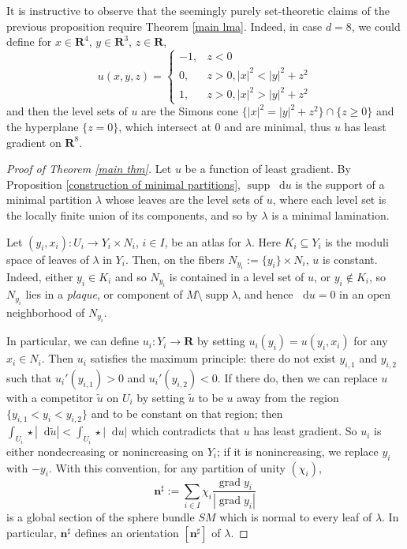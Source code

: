 \documentclass[reqno,11pt]{amsart}
\newcommand{\RR}{\mathbf{R}}
\DeclareMathOperator{\supp}{supp}
\newcommand*\dif{\mathop{}\!\mathrm{d}}
\DeclareMathOperator{\grad}{grad}
\newcommand{\normal}{\mathbf n}
\newcommand{\dfn}[1]{\emph{#1}\index{#1}}
\theoremstyle{definition}
\numberwithin{equation}{section}
\begin{document}
It is instructive to observe that the seemingly purely set-theoretic claims of the previous proposition require Theorem \ref{main lma}.
Indeed, in case $d = 8$, we could define for $x \in \RR^4$, $y \in \RR^3$, $z \in \RR$,
$$u(x, y, z) = \begin{cases}
-1, & z < 0 \\
0, & z > 0, |x|^2 < |y|^2 + z^2 \\
1, & z > 0, |x|^2 > |y|^2 + z^2
\end{cases}$$
and then the level sets of $u$ are the Simons cone $\{|x|^2 = |y|^2 + z^2\} \cap \{z \geq 0\}$ and the hyperplane $\{z = 0\}$, which intersect at $0$ and are minimal, thus $u$ has least gradient on $\RR^8$.

\begin{proof}[Proof of Theorem \ref{main thm}]
Let $u$ be a function of least gradient.
By Proposition \ref{construction of minimal partitions}, $\supp \dif u$ is the support of a minimal partition $\lambda$ whose leaves are the level sets of $u$, where each level set is the locally finite union of its components, and so by \cite[TODO]{BackusCML} $\lambda$ is a minimal lamination.

Let $(y_i, x_i): U_i \to Y_i \times N_i$, $i \in I$, be an atlas for $\lambda$.
Here $K_i \subseteq Y_i$ is the moduli space of leaves of $\lambda$ in $Y_i$.
Then, on the fibers $N_{y_i} := \{y_i\} \times N_i$, $u$ is constant.
Indeed, either $y_i \in K_i$ and so $N_{y_i}$ is contained in a level set of $u$, or $y_i \notin K_i$, so $N_{y_i}$ lies in a \dfn{plaque}, or component of $M \setminus \supp \lambda$, and hence $\dif u = 0$ in an open neighborhood of $N_{y_i}$.

In particular, we can define $u_i: Y_i \to \RR$ by setting $u_i(y_i) = u(y_i, x_i)$ for any $x_i \in N_i$.
Then $u_i$ satisfies the maximum principle: there do not exist $y_{i,1}$ and $y_{i,2}$ such that $u_i'(y_{i,1}) > 0$ and $u_i'(y_{i,2}) < 0$.
If there do, then we can replace $u$ with a competitor $\tilde u$ on $U_i$ by setting $\tilde u$ to be $u$ away from the region $\{y_{i,1} < y_i < y_{i,2}\}$ and to be constant on that region; then $\int_{U_i} \star |\dif \tilde u| < \int_{U_i} \star |\dif u|$ which contradicts that $u$ has least gradient.
So $u_i$ is either nondecreasing or nonincreasing on $Y_i$; if it is nonincreasing, we replace $y_i$ with $-y_i$.
With this convention, for any partition of unity $(\chi_i)$,
$$\normal^\sharp := \sum_{i \in I} \chi_i \frac{\grad y_i}{|\grad y_i|}$$
is a global section of the sphere bundle $SM$ which is normal to every leaf of $\lambda$. In particular, $\normal^\sharp$ defines an orientation $[\normal^\sharp]$ of $\lambda$.


\end{proof}
\end{document}
